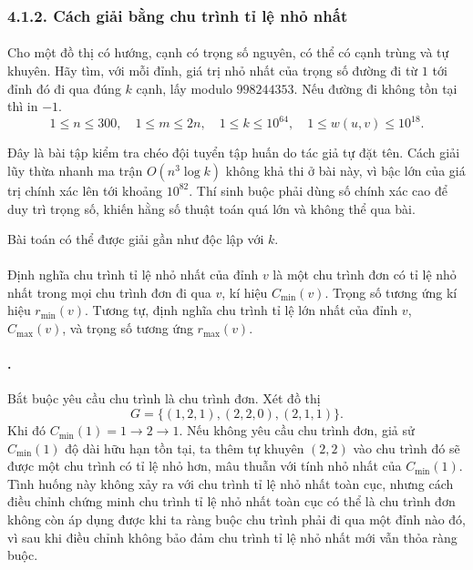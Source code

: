 \documentclass[11pt]{article}
\begin{document}
\subsubsection*{4.1.2. Cách giải bằng chu trình tỉ lệ nhỏ nhất}

\paragraph{}
Cho một đồ thị có hướng, cạnh có trọng số nguyên, có thể có cạnh trùng và tự
khuyên. Hãy tìm, với mỗi đỉnh, giá trị nhỏ nhất của trọng số đường đi từ \(1\)
tới đỉnh đó đi qua đúng \(k\) cạnh, lấy modulo \(998244353\). Nếu đường đi
không tồn tại thì in \(-1\).
\[
  1\le n\le300,\quad
  1\le m\le2n,\quad
  1\le k\le10^{64},\quad
  1\le w(u,v)\le10^{18}.
\]

Đây là bài tập kiểm tra chéo đội tuyển tập huấn do tác giả tự đặt tên. Cách
giải lũy thừa nhanh ma trận \(O(n^3\log k)\) không khả thi ở bài này, vì bậc
lớn của giá trị chính xác lên tới khoảng \(10^{82}\). Thí sinh buộc phải dùng
số chính xác cao để duy trì trọng số, khiến hằng số thuật toán quá lớn và
không thể qua bài.

Bài toán có thể được giải gần như độc lập với \(k\).

\paragraph{}
Định nghĩa chu trình tỉ lệ nhỏ nhất của đỉnh \(v\) là một chu trình đơn có tỉ
lệ nhỏ nhất trong mọi chu trình đơn đi qua \(v\), kí hiệu \(C_{\min}(v)\).
Trọng số tương ứng kí hiệu \(r_{\min}(v)\). Tương tự, định nghĩa chu trình tỉ
lệ lớn nhất của đỉnh \(v\), \(C_{\max}(v)\), và trọng số tương ứng
\(r_{\max}(v)\).

\paragraph{.}
Bắt buộc yêu cầu chu trình là chu trình đơn. Xét đồ thị
\[
  G=\{(1,2,1),(2,2,0),(2,1,1)\}.
\]
Khi đó \(C_{\min}(1)=1\to2\to1\). Nếu không yêu cầu chu trình đơn, giả sử
\(C_{\min}(1)\) độ dài hữu hạn tồn tại, ta thêm tự khuyên \((2,2)\) vào chu
trình đó sẽ được một chu trình có tỉ lệ nhỏ hơn, mâu thuẫn với tính nhỏ nhất
của \(C_{\min}(1)\). Tình huống này không xảy ra với chu trình tỉ lệ nhỏ nhất
toàn cục, nhưng cách điều chỉnh chứng minh chu trình tỉ lệ nhỏ nhất toàn cục
có thể là chu trình đơn không còn áp dụng được khi ta ràng buộc chu trình phải
đi qua một đỉnh nào đó, vì sau khi điều chỉnh không bảo đảm chu trình tỉ lệ nhỏ
nhất mới vẫn thỏa ràng buộc.
\end{document}
